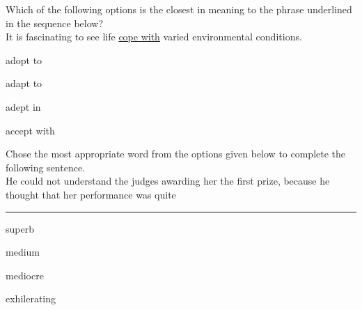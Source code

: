 \iffalse
\chapter{2014}
\author{EE24BTECH11005}
\section{ee}
\fi
    \item Which of the following options is the closest in meaning to the phrase underlined in the sequence below?\\
        It is fascinating to see life \underline{cope with} varied environmental conditions.
        \begin{enumerate}
                \begin{multicols}{2}
                \item adopt to
                    \columnbreak
                \item adapt to
                \end{multicols}
                \begin{multicols}{2}
                \item adept in
                    \columnbreak
                \item accept with

                \end{multicols}
        \end{enumerate}
    \item Chose the most appropriate word from the options given below to complete the following sentence.\\
        He could not understand the judges awarding her the first prize, because he thought that her performance was quite \rule{2cm}{0.2pt}
        \begin{enumerate}
                \begin{multicols}{2}
                \item superb
                    \columnbreak
                \item medium

                \end{multicols}
                \begin{multicols}{2}
                \item mediocre

                    \columnbreak
                \item exhilerating

                \end{multicols}
        \end{enumerate}
